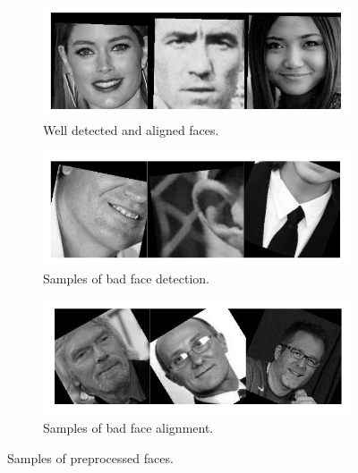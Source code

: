 \begin{figure}[!h]
	\centering
	\begin{subfigure}[b]{\textwidth}
		\includegraphics[width=\textwidth]{figures/good_pp}
		\caption{Well detected and aligned faces.}
		\label{fig:goodPP}
	\end{subfigure}%
	
	\begin{subfigure}[b]{\textwidth}
		\includegraphics[width=\textwidth]{figures/bad_detection}
		\caption{Samples of bad face detection.}
		\label{fig:badDet}
	\end{subfigure}
	
	\begin{subfigure}[b]{\textwidth}
		\includegraphics[width=\textwidth]{figures/bad_alignment}
		\caption{Samples of bad face alignment.}
		\label{fig:badAl}
	\end{subfigure}
	\caption{Samples of preprocessed faces.}\label{fig:sampPP}
\end{figure}


